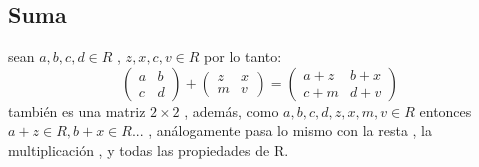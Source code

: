 \documentclass[10pt,a4paper]{article} %
\begin{document}
        \subsection{Suma}
            sean $ a,b,c,d \in R  $ , $ z,x,c,v \in R  $  por lo tanto:
                \begin{equation}
                    \begin{pmatrix}
                        a & b
                        \\ c & d
                    \end{pmatrix}
                    +
                    \begin{pmatrix}
                        z & x
                        \\ m & v
                    \end{pmatrix}
                    =
                    \begin{pmatrix}
                        a+z & b+x
                        \\c+m & d+v
                    \end{pmatrix}

                \end{equation}
                también es una matriz $ 2 \times 2  $ , además, como $
                a,b,c,d,z,x,m,v \in R  $ entonces $ a+z \in R , b+x \in R...
                $ , análogamente pasa lo mismo con la resta , la multiplicación
                , y todas las propiedades de R.















    \nocite{*}
    
    
\end{document}
